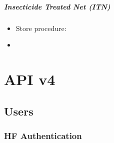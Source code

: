 \documentclass[letterpaper,10pt,english,openany,oneside]{sphinxmanual}
\begin{document}
\paragraph{Insecticide Treated Net (ITN)}
\label{\detokenize{module/module:insecticide-treated-net-itn}}\begin{itemize}
\item {} 
\sphinxAtStartPar
Store procedure: 

\item {} 
\end{itemize}


\chapter{API v4}
\label{\detokenize{api/v4:api-v4}}\label{\detokenize{api/v4::doc}}

\section{Users}
\label{\detokenize{api/v4:users}}

\subsection{HF Authentication}
\label{\detokenize{api/v4:hf-authentication}}
\end{document}
